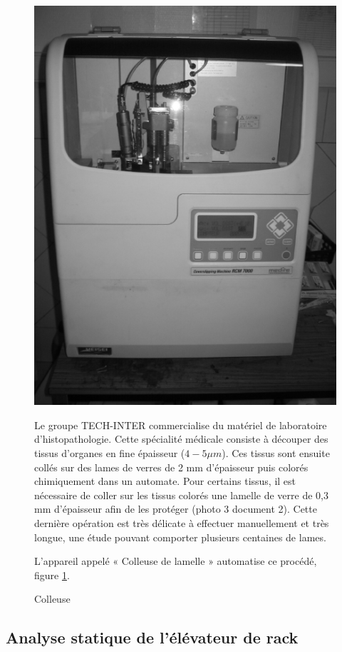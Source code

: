 \begin{figure}[!h]
  \begin{minipage}{0.35\linewidth}
  \centering\includegraphics[width=0.8\linewidth]{img/colleuse.png}
  \caption{Colleuse}
  \label{img1}
  \end{minipage}
  \hfill
  \begin{minipage}{0.60\linewidth}
  Le groupe TECH-INTER commercialise du matériel de laboratoire d'histopathologie. Cette spécialité médicale consiste à découper des tissus d'organes en fine épaisseur ($4-5 \mu m$). Ces tissus sont ensuite collés sur des lames de verres de 2 mm d'épaisseur puis colorés chimiquement dans un automate. Pour certains tissus, il est nécessaire de coller sur les tissus colorés une lamelle de verre de 0,3 mm d'épaisseur afin de les protéger (photo 3 document 2). Cette dernière opération est très délicate à effectuer manuellement et très longue, une étude pouvant comporter plusieurs centaines de lames.

  L'appareil appelé « Colleuse de lamelle » automatise ce procédé, figure \ref{img1}.
\end{minipage}
\end{figure}

\subsection{Analyse statique de l'élévateur de rack}

